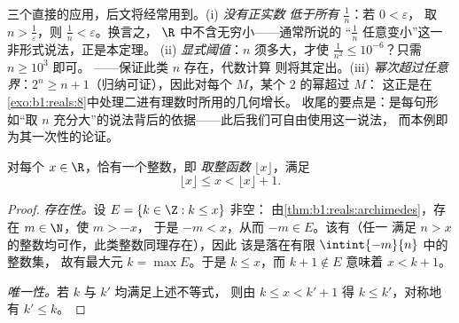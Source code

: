 \begin{example}[阿基米德性质的应用]\label{ex:b1:reals:archimedeswork}
三个直接的应用，后文将经常用到。(i) \emph{没有正实数
低于所有 $\frac1n$}：若 $0 < \varepsilon$，
取 $n > \frac1\varepsilon$，则 $\frac1n < \varepsilon$。换言之，
$\R$ 中不含无穷小——通常所说的
“$\frac1n$ 任意变小”这一非形式说法，正是本定理。
(ii) \emph{显式阈值}：$n$ 须多大，才使
$\frac{1}{n^2} \leq 10^{-6}$？只需 $n \geq 10^3$ 即可。
——保证此类 $n$ 存在，代数计算
则将其定出。(iii) \emph{幂次超过任意界}：$2^n \geq n +
1$（归纳可证），因此对每个 $M$，某个 $2$ 的幂超过 $M$：
这正是在\cref{exo:b1:reals:8}中处理二进有理数时所用的几何增长。
收尾的要点是：是每句形如“取
$n$ 充分大”的说法背后的依据——此后我们可自由使用这一说法，
而本例即为其一次性的论证。
\end{example}

\begin{theorem}[取整函数]\label{thm:b1:reals:floor}
对每个 $x \in \R$，恰有一个整数，即
\emph{取整函数} $\lfloor x \rfloor$，满足
\[
\lfloor x \rfloor \leq x < \lfloor x \rfloor + 1 .
\]
\end{theorem}

\begin{proof}
\emph{存在性。}设 $E = \{k \in \Z : k \leq x\}$ 非空：
由\cref{thm:b1:reals:archimedes}，存在 $m \in \N$，使 $m > -x$，
于是 $-m < x$，从而 $-m \in E$。该有（任一
满足 $n > x$ 的整数均可作，此类整数同理存在），因此
该是落在有限 $\intint{-m}{n}$ 中的整数集，
故有最大元 $k = \max E$。于是 $k \leq x$，而 $k + 1 \notin E$
意味着 $x < k + 1$。

\emph{唯一性。}若 $k$ 与 $k'$ 均满足上述不等式，
则由 $k \leq x < k' + 1$ 得 $k \leq k'$，对称地有 $k'
\leq k$。
\end{proof}

